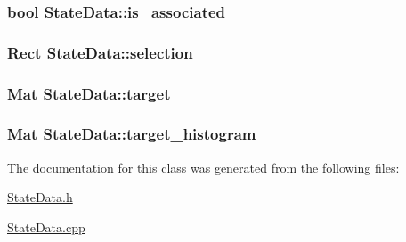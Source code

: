 \hypertarget{classStateData_ad5f3d2a522bfdcff47e7d028bf19f012}{
\subsubsection[{is\-\_\-associated}]{\setlength{\rightskip}{0pt plus 5cm}bool State\-Data\-::is\-\_\-associated}}\label{classStateData_ad5f3d2a522bfdcff47e7d028bf19f012}
\hypertarget{classStateData_afea0bc5d1743e2db008238bfe9f574ce}{
\subsubsection[{selection}]{\setlength{\rightskip}{0pt plus 5cm}Rect State\-Data\-::selection}}\label{classStateData_afea0bc5d1743e2db008238bfe9f574ce}
\hypertarget{classStateData_ac778c44e62237a225361a80894a48ee8}{
\subsubsection[{target}]{\setlength{\rightskip}{0pt plus 5cm}Mat State\-Data\-::target}}\label{classStateData_ac778c44e62237a225361a80894a48ee8}
\hypertarget{classStateData_af93e02e6025c07b7a383b2e755f52dca}{
\subsubsection[{target\-\_\-histogram}]{\setlength{\rightskip}{0pt plus 5cm}Mat State\-Data\-::target\-\_\-histogram}}\label{classStateData_af93e02e6025c07b7a383b2e755f52dca}


The documentation for this class was generated from the following files\-:\begin{DoxyCompactItemize}
\item 
\hyperlink{StateData_8h}{State\-Data.\-h}\item 
\hyperlink{StateData_8cpp}{State\-Data.\-cpp}\end{DoxyCompactItemize}
